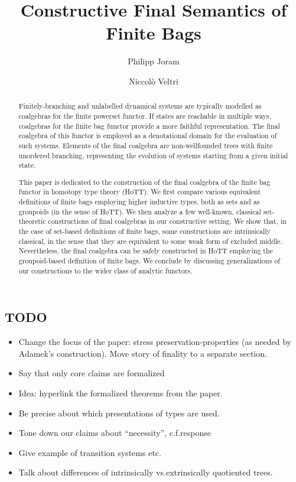 \documentclass[a4paper,USenglish,cleveref]{lipics-v2021}
\title{Constructive Final Semantics of Finite Bags}
\author{Philipp Joram}%
  {Department of Software Science, Tallinn University of Technology, Estonia}
  {philipp@cs.ioc.ee}%
  {https://orcid.org/0000-0002-0448-7907}%
  {}
\author{Niccol{\`o} Veltri}%
  {Department of Software Science, Tallinn University of Technology, Estonia}
  {niccolo@cs.ioc.ee}%
  {https://orcid.org/0000-0002-7230-3436}%
  {}
\begin{document}
\maketitle

\begin{abstract}
  Finitely-branching and unlabelled dynamical systems are typically modelled as coalgebras for the finite powerset functor.
  If states are reachable in multiple ways, coalgebras for the finite bag functor provide a more faithful representation.
  The final coalgebra of this functor is employed as a denotational domain for the evaluation of such systems.
  Elements of the final coalgebra are non-wellfounded trees with finite unordered branching,
  representing the evolution of systems starting from a given initial state.

  This paper is dedicated to the construction of the final coalgebra of the finite bag functor in homotopy type theory (HoTT).
  We first compare various equivalent definitions of finite bags employing higher inductive types, both as sets and as groupoids (in the sense of HoTT).
  We then analyze a few well-known, classical set-theoretic constructions of final coalgebras in our constructive setting.
  We show that, in the case of set-based definitions of finite bags,
  some constructions are intrinsically classical, in the sense that they are equivalent to some weak form of excluded middle.
  Nevertheless, the final coalgebra can be safely constructed in HoTT employing the groupoid-based definition of finite bags.
  We conclude by discussing generalizations of our constructions to the wider class of analytic functors.

\end{abstract}

\setcounter{tocdepth}{1}

\subsection{TODO}

\begin{itemize}
  \item
    Change the focus of the paper:
    stress preservation-properties (as needed by Adamek's construction).
    Move story of finality to a separate section.
  \item
    Say that only core claims are formalized
  \item
    Idea: hyperlink the formalized theorems from the paper.
  \item
    Be precise about which presentations of types are used.
  \item
    Tone down our claims about \enquote{necessity}, c.f.\@ response
  \item
    Give example of transition systems etc.
  \item
    Talk about differences of intrinsically vs.\@ extrinsically quotiented trees.
\end{itemize}
\end{document}
